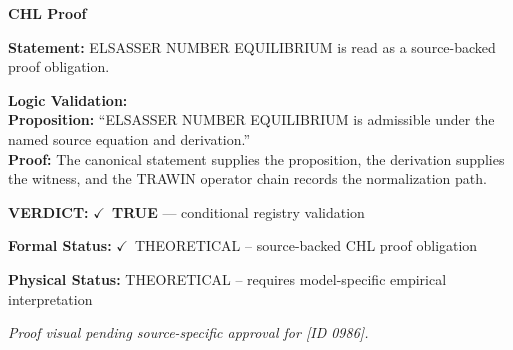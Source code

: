 \vspace{0.45em}
\noindent\textbf{CHL Proof}\par
\textbf{Statement:} ELSASSER NUMBER EQUILIBRIUM is read as a source-backed proof obligation.

\textbf{Logic Validation:}\\
\textbf{Proposition:} ``ELSASSER NUMBER EQUILIBRIUM is admissible under the named source equation and derivation.''\\
\textbf{Proof:} The canonical statement supplies the proposition, the derivation supplies the witness, and the TRAWIN operator chain records the normalization path.

\textbf{VERDICT:} \ensuremath{\checkmark}\ \textbf{TRUE} --- conditional registry validation

\textbf{Formal Status:} \ensuremath{\checkmark}\ THEORETICAL -- source-backed CHL proof obligation

\textbf{Physical Status:} THEORETICAL -- requires model-specific empirical interpretation
\par\vspace{0.45em}
\par
\vfill
\begingroup\footnotesize\itshape
Proof visual pending source-specific approval for [ID 0986].
\par\endgroup
\vfill
\endgroup
\endgroup
